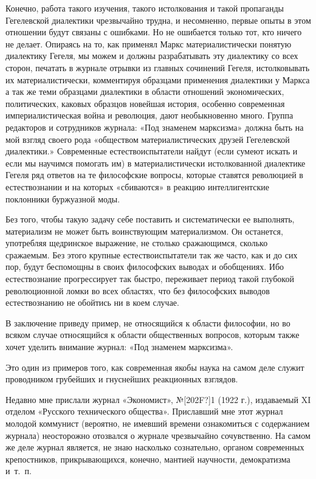 \documentclass[twoside]{article}
\begin{document}
Конечно, работа такого изучения, такого истолкования и такой пропаганды
Гегелевской диалектики чрезвычайно трудна, и несомненно, первые опыты в
этом отношении будут связаны с ошибками. Но не ошибается только тот, кто
ничего не делает. Опираясь на то, как применял Маркс материалистически
понятую диалектику Гегеля, мы можем и должны разрабатывать эту диалектику
со всех сторон, печатать в журнале отрывки из главных сочинений Гегеля,
истолковывать их материалистически, комментируя образцами применения
диалектики у Маркса а так же теми образцами диалектики в области отношений
экономических, политических, каковых образцов новейшая история, особенно
современная империалистическая война и революция, дают необыкновенно много.
Группа редакторов и сотрудников журнала: «Под знаменем марксизма» должна
быть на мой взгляд своего рода «обществом материалистических друзей
Гегелевской диалектики.» Современные естествоиспытатели найдут (если сумеют
искать и если мы научимся помогать им) в материалистически истолкованной
диалектике Гегеля ряд ответов на те философские вопросы, которые ставятся
революцией в естествознании и на которых «сбиваются» в реакцию
интеллигентские поклонники буржуазной моды.

Без того, чтобы такую задачу себе поставить и систематически ее выполнять,
материализм не может быть воинствующим материализмом. Он останется,
употребляя щедринское выражение, не столько сражающимся, сколько сражаемым.
Без этого крупные естествоиспытатели так же часто, как и до сих пор, будут
беспомощны в своих философских выводах и обобщениях. Ибо естествознание
прогрессирует так быстро, переживает период такой глубокой революционной
ломки во всех областях, что без философских выводов естествознанию не
обойтись ни в коем случае.

В заключение приведу пример, не относящийся к области философии, но во
всяком случае относящийся к области общественных вопросов, которым также
хочет уделить внимание журнал: «Под знаменем марксизма».

Это один из примеров того, как современная якобы наука на самом деле служит
проводником грубейших и гнуснейших реакционных взглядов.

Недавно мне прислали журнал «Экономист», №\textlatin{[202F?]}1 (1922 г.),
издаваемый XI отделом «Русского технического общества». Приславший мне этот
журнал молодой коммунист (вероятно, не имевший времени ознакомиться с
содержанием журнала) неосторожно отозвался о журнале чрезвычайно
сочувственно. На самом же деле журнал является, не знаю насколько
сознательно, органом современных крепостников, прикрывающихся, конечно,
мантией научности, демократизма и~т.~п.
\end{document}
